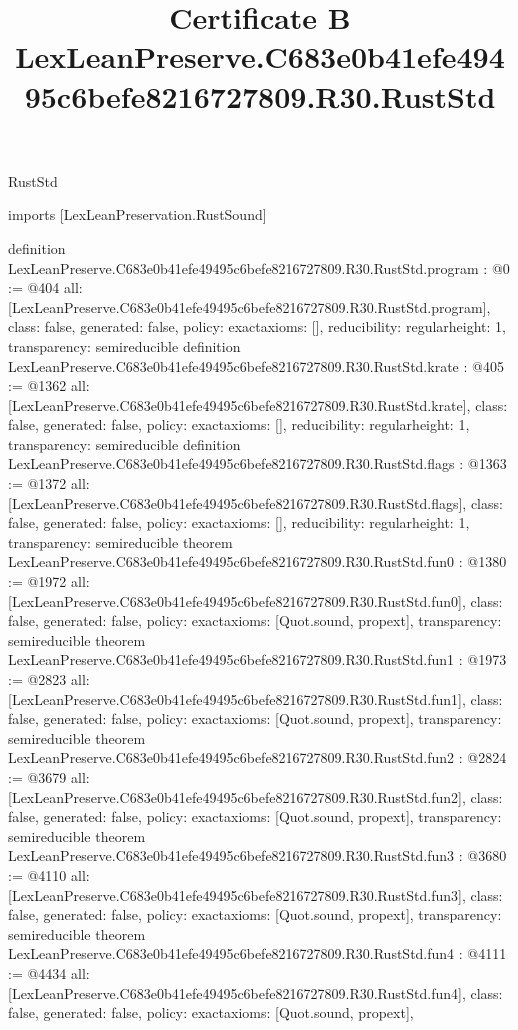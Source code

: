 \begin{lexlean}{RustStd}
\title{Certificate B LexLeanPreserve.C683e0b41efe49495c6befe8216727809.R30.RustStd}
\begin{coremodule}
imports [LexLeanPreservation.RustSound]

definition LexLeanPreserve.C683e0b41efe49495c6befe8216727809.R30.RustStd.program : @0 := @404 {
  all: [LexLeanPreserve.C683e0b41efe49495c6befe8216727809.R30.RustStd.program],
  class: false,
  generated: false,
  policy: exact{axioms: []},
  reducibility: regular{height: 1},
  transparency: semireducible
}
definition LexLeanPreserve.C683e0b41efe49495c6befe8216727809.R30.RustStd.krate : @405 := @1362 {
  all: [LexLeanPreserve.C683e0b41efe49495c6befe8216727809.R30.RustStd.krate],
  class: false,
  generated: false,
  policy: exact{axioms: []},
  reducibility: regular{height: 1},
  transparency: semireducible
}
definition LexLeanPreserve.C683e0b41efe49495c6befe8216727809.R30.RustStd.flags : @1363 := @1372 {
  all: [LexLeanPreserve.C683e0b41efe49495c6befe8216727809.R30.RustStd.flags],
  class: false,
  generated: false,
  policy: exact{axioms: []},
  reducibility: regular{height: 1},
  transparency: semireducible
}
theorem LexLeanPreserve.C683e0b41efe49495c6befe8216727809.R30.RustStd.fun0 : @1380 := @1972 {
  all: [LexLeanPreserve.C683e0b41efe49495c6befe8216727809.R30.RustStd.fun0],
  class: false,
  generated: false,
  policy: exact{axioms: [Quot.sound, propext]},
  transparency: semireducible
}
theorem LexLeanPreserve.C683e0b41efe49495c6befe8216727809.R30.RustStd.fun1 : @1973 := @2823 {
  all: [LexLeanPreserve.C683e0b41efe49495c6befe8216727809.R30.RustStd.fun1],
  class: false,
  generated: false,
  policy: exact{axioms: [Quot.sound, propext]},
  transparency: semireducible
}
theorem LexLeanPreserve.C683e0b41efe49495c6befe8216727809.R30.RustStd.fun2 : @2824 := @3679 {
  all: [LexLeanPreserve.C683e0b41efe49495c6befe8216727809.R30.RustStd.fun2],
  class: false,
  generated: false,
  policy: exact{axioms: [Quot.sound, propext]},
  transparency: semireducible
}
theorem LexLeanPreserve.C683e0b41efe49495c6befe8216727809.R30.RustStd.fun3 : @3680 := @4110 {
  all: [LexLeanPreserve.C683e0b41efe49495c6befe8216727809.R30.RustStd.fun3],
  class: false,
  generated: false,
  policy: exact{axioms: [Quot.sound, propext]},
  transparency: semireducible
}
theorem LexLeanPreserve.C683e0b41efe49495c6befe8216727809.R30.RustStd.fun4 : @4111 := @4434 {
  all: [LexLeanPreserve.C683e0b41efe49495c6befe8216727809.R30.RustStd.fun4],
  class: false,
  generated: false,
  policy: exact{axioms: [Quot.sound, propext]},
}
\end{coremodule}
\end{lexlean}
